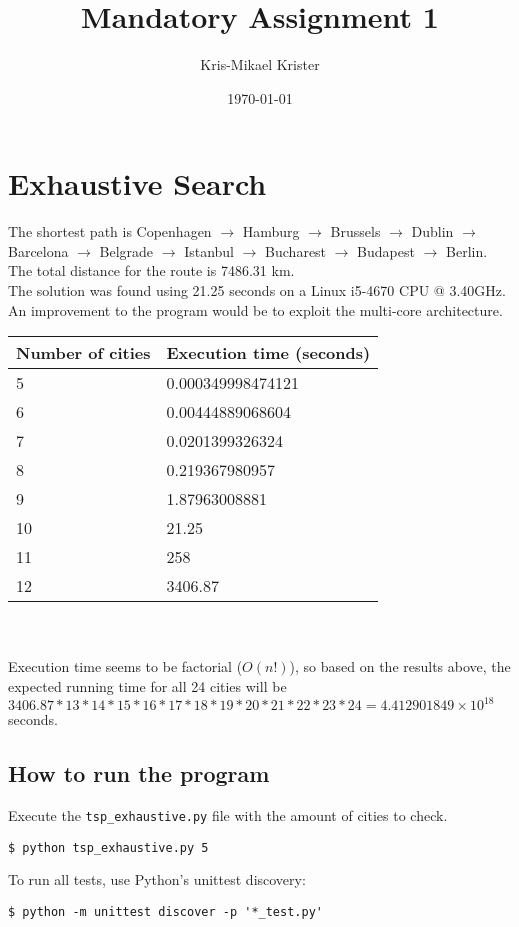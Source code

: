 \documentclass{article}
\title{Mandatory Assignment 1}
\author{Kris-Mikael Krister}
\date{\today}
\begin{document}
\maketitle
\section*{Exhaustive Search}

The shortest path is Copenhagen $\rightarrow$ Hamburg $\rightarrow$ Brussels $\rightarrow$ Dublin $\rightarrow$ Barcelona $\rightarrow$ Belgrade $\rightarrow$ Istanbul $\rightarrow$ Bucharest $\rightarrow$ Budapest $\rightarrow$ Berlin. The total distance for the route is 7486.31 km.\\

\noindent The solution was found using 21.25 seconds on a Linux i5-4670 CPU @ 3.40GHz. An improvement to the program would be to exploit the multi-core architecture.\\

\begin{tabular}{ll}
\toprule
Number of cities & Execution time (seconds) \\
\midrule
5 & 0.000349998474121 \\
6 & 0.00444889068604 \\
7 & 0.0201399326324 \\
8 & 0.219367980957 \\
9 & 1.87963008881 \\
10 & 21.25 \\
11 & 258 \\
12 & 3406.87 \\
\bottomrule
\end{tabular}\\\\

\noindent Execution time seems to be factorial ($O(n!)$), so based on the results above, the expected running time for all 24 cities will be $3406.87 * 13 * 14 * 15 * 16 * 17 * 18 * 19 * 20 * 21 * 22 * 23 * 24 = 4.412901849 \times 10^{18}$ seconds.

\subsection*{How to run the program}

Execute the \texttt{tsp\_exhaustive.py} file with the amount of cities to check.

\begin{verbatim}
$ python tsp_exhaustive.py 5
\end{verbatim}

To run all tests, use Python's unittest discovery:

\begin{verbatim}
$ python -m unittest discover -p '*_test.py'
\end{verbatim}
\end{document}

